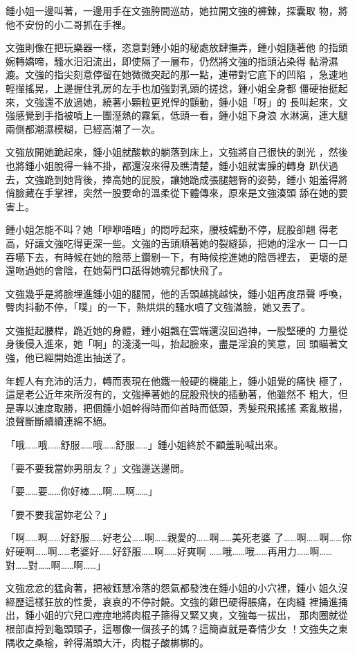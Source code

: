 鍾小姐一邊叫著，一邊用手在文強胯間巡訪，她拉開文強的褲鍊，探囊取
物，將他不安份的小二哥抓在手裡。

文強則像在把玩樂器一樣，恣意對鍾小姐的秘處放肆撫弄，鍾小姐隨著他
的指頭婉轉嬌啼，騷水汨汨流出，即使隔了一層布，仍然將文強的指頭沾染得
黏滑濕漉。文強的指尖刻意停留在她微微突起的那一點，連帶對它底下的凹陷
，急速地輕攆搖晃，上邊握住乳房的左手也加強對乳頭的搓捻，鍾小姐全身都
僵硬抬挺起來，文強還不放過她，繞著小顆粒更兇悍的顫動，鍾小姐「呀」的
長叫起來，文強感覺到手指被噴上一團溼熱的霧氣，低頭一看，鍾小姐下身浪
水淋漓，連大腿兩側都潮濕模糊，已經高潮了一次。

文強放開她跪起來，鍾小姐就酸軟的躺落到床上，文強將自己很快的剝光
，然後也將鍾小姐脫得一絲不掛，都還沒來得及瞧清楚，鍾小姐就害臊的轉身
趴伏過去，文強跪到她背後，捧高她的屁股，讓她跪成張腿翹臀的姿勢，鍾小
姐羞得將俏臉藏在手掌裡，突然一股要命的溫柔從下體傳來，原來是文強湊頭
舔在她的要害上。

鍾小姐怎能不叫？她「咿咿唔唔」的悶哼起來，腰枝蠕動不停，屁股卻翹
得老高，好讓文強吃得更深一些。文強的舌頭順著她的裂縫舔，把她的淫水一
口一口吞嚥下去，有時候在她的陰蒂上鑽剔一下，有時候挖進她的陰唇裡去，
更壞的是還吻過她的會陰，在她菊門口舐得她魂兒都快飛了。

文強幾乎是將臉埋進鍾小姐的腿間，他的舌頭越挑越快，鍾小姐再度昂聲
呼喚，臀肉抖動不停，「噗」的一下，熱烘烘的騷水噴了文強滿臉，她又丟了。

文強挺起腰桿，跪近她的身體，鍾小姐飄在雲端還沒回過神，一股堅硬的
力量從身後侵入進來，她「啊」的淺淺一叫，抬起臉來，盡是淫浪的笑意，回
頭瞄著文強，他已經開始進出抽送了。

年輕人有充沛的活力，轉而表現在他鐵一般硬的機能上，鍾小姐覺的痛快
極了，這是老公近年來所沒有的，文強捧著她的屁股飛快的插動著，他雖然不
粗大，但是專以速度取勝，把個鍾小姐幹得時而仰首時而低頭，秀髮飛飛搖搖
紊亂散揚，浪聲斷斷續續連綿不絕。

「哦……哦……舒服……哦……舒服……」鍾小姐終於不顧羞恥喊出來。

「要不要我當妳男朋友？」文強邊送邊問。

「要……要……你好棒……啊……啊……」

「要不要我當妳老公？」

「啊……啊……好舒服……好老公……啊……親愛的……啊……美死老婆
了……啊……啊……你好硬啊……啊……老婆好……好舒服……啊……好爽啊
……哦……哦……再用力……啊……對……對……啊……啊……」

文強忿忿的猛肏著，把被鈺慧冷落的怨氣都發洩在鍾小姐的小穴裡，鍾小
姐久沒經歷這樣狂放的性愛，哀哀的不停討饒。文強的雞巴硬得脹痛，在肉縫
裡捅進捅出，鍾小姐的穴兒口痙痙地將肉棍子箍得又緊又爽，文強每一拔出，
那肉圈就從根部直捋到龜頭頸子，這哪像一個孩子的媽？這簡直就是春情少女
！文強失之東隅收之桑榆，幹得滿頭大汗，肉棍子酸梆梆的。

